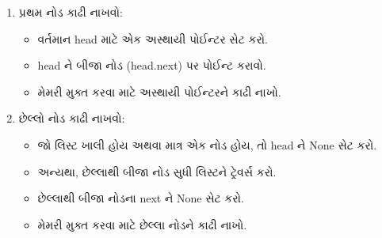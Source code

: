 \begin{enumerate}
\def\labelenumi{\arabic{enumi}.}
\tightlist
\item
  પ્રથમ નોડ કાઢી નાખવો:

  \begin{itemize}
  \tightlist
  \item
    વર્તમાન head માટે એક અસ્થાયી પોઈન્ટર સેટ કરો.
  \item
    head ને બીજા નોડ (head.next) પર પોઈન્ટ કરાવો.
  \item
    મેમરી મુક્ત કરવા માટે અસ્થાયી પોઈન્ટરને કાઢી નાખો.
  \end{itemize}

\begin{Shaded}
\begin{Highlighting}[]
\NormalTok{):}
     
\OperatorTok{=} 
        \OperatorTok{=} 
\end{Highlighting}
\end{Shaded}
\item
  છેલ્લો નોડ કાઢી નાખવો:

  \begin{itemize}
  \tightlist
  \item
    જો લિસ્ટ ખાલી હોય અથવા માત્ર એક નોડ હોય, તો head ને None સેટ કરો.
  \item
    અન્યથા, છેલ્લાથી બીજા નોડ સુધી લિસ્ટને ટ્રેવર્સ કરો.
  \item
    છેલ્લાથી બીજા નોડના next ને None સેટ કરો.
  \item
    મેમરી મુક્ત કરવા માટે છેલ્લા નોડને કાઢી નાખો.
  \end{itemize}

\begin{Shaded}
\begin{Highlighting}[]
\NormalTok{):}
      
      \NormalTok{:}
         
        \OperatorTok{=} 
\OperatorTok{=} 
    \NormalTok{:}
\OperatorTok{=}
 \OperatorTok{=} 
\end{Highlighting}
\end{Shaded}
\end{enumerate}

